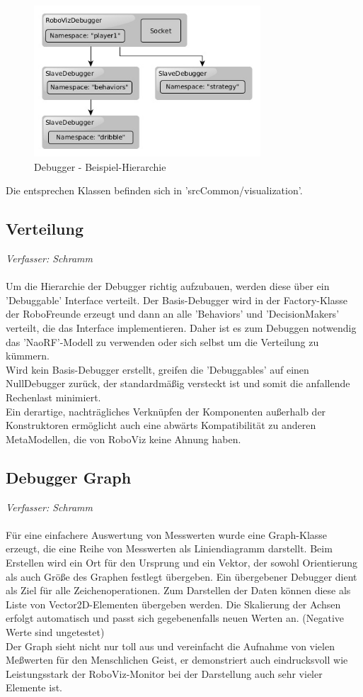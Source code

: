 \begin{figure}[H]
	\centering
	\includegraphics[width=240pt]{Grafiken/RoboViz/Debugger}
	\caption{Debugger - Beispiel-Hierarchie}
	\label{fig:debugger-hierarchy}
\end{figure}

Die entsprechen Klassen befinden sich in 'srcCommon/visualization'.

\subsection{Verteilung}
\label{subsec:Debugger Verteilung}
\textit{Verfasser: Schramm}\\
\\
Um die Hierarchie der Debugger richtig aufzubauen, werden diese über ein 'Debuggable' Interface verteilt. Der Basis-Debugger wird in der Factory-Klasse der RoboFreunde erzeugt und dann an alle 'Behaviors' und 'DecisionMakers' verteilt, die das Interface implementieren. Daher ist es zum Debuggen notwendig das 'NaoRF'-Modell zu verwenden oder sich selbst um die Verteilung zu kümmern.\\
Wird kein Basis-Debugger erstellt, greifen die 'Debuggables' auf einen NullDebugger zurück, der standardmäßig versteckt ist und somit die anfallende Rechenlast minimiert.\\
Ein derartige, nachträgliches Verknüpfen der Komponenten außerhalb der Konstruktoren ermöglicht auch eine abwärts Kompatibilität zu anderen MetaModellen, die von RoboViz keine Ahnung haben.

\subsection{Debugger Graph}
\label{subsec:Debugger Graph}
\textit{Verfasser: Schramm}\\
\\
Für eine einfachere Auswertung von Messwerten wurde eine Graph-Klasse erzeugt, die eine Reihe von Messwerten als Liniendiagramm darstellt. Beim Erstellen wird ein Ort für den Ursprung und ein Vektor, der sowohl Orientierung als auch Größe des Graphen festlegt übergeben. Ein übergebener Debugger dient als Ziel für alle Zeichenoperationen. Zum Darstellen der Daten können diese als Liste von Vector2D-Elementen übergeben werden. Die Skalierung der Achsen erfolgt automatisch und passt sich gegebenenfalls neuen Werten an. (Negative Werte sind ungetestet)\\
Der Graph sieht nicht nur toll aus und vereinfacht die Aufnahme von vielen Meßwerten für den Menschlichen Geist, er demonstriert auch eindrucksvoll wie Leistungsstark der RoboViz-Monitor bei der Darstellung auch sehr vieler Elemente ist.

